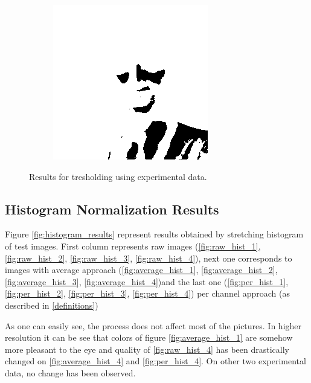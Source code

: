 \documentclass{article}
\begin{document}
\begin{figure}[H]
\begin{subfigure}{.3\textwidth}
  \caption{}
  \label{fig:tresh_good_4}
\end{subfigure}%
\begin{subfigure}{.3\textwidth}
  \centering
  \includegraphics[width=0.97\linewidth]{_Figures/sample_4_bad_tresholding.png}
    \caption{}
  \label{fig:tresh_bad_4}
\end{subfigure}

\caption{Results for tresholding using experimental data.}
\label{fig:results_tresh}
\end{figure}

%
%
\subsection{Histogram Normalization Results}
Figure \ref{fig:histogram_results} represent results obtained by stretching histogram of test images. First column represents raw images (\ref{fig:raw_hist_1}, \ref{fig:raw_hist_2}, \ref{fig:raw_hist_3}, \ref{fig:raw_hist_4}), next one corresponds to images with average approach (\ref{fig:average_hist_1}, \ref{fig:average_hist_2}, \ref{fig:average_hist_3}, \ref{fig:average_hist_4})and the last one (\ref{fig:per_hist_1}, \ref{fig:per_hist_2}, \ref{fig:per_hist_3}, \ref{fig:per_hist_4}) per channel approach (as described in \ref{definitions})

As one can easily see, the process does not affect most of the pictures. In higher resolution it can be see that colors of figure \ref{fig:average_hist_1} are somehow more pleasant to the eye and quality of \ref{fig:raw_hist_4} has been drastically changed on \ref{fig:average_hist_4} and \ref{fig:per_hist_4}. On other two experimental data, no change has been observed.
\end{document}
